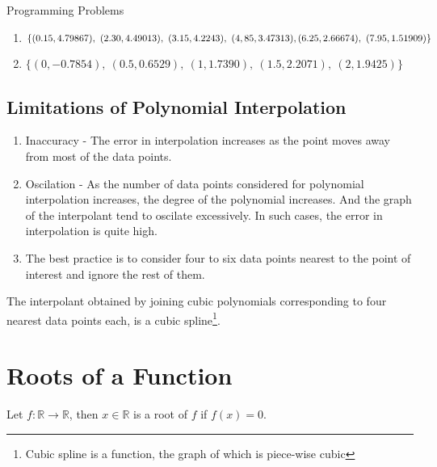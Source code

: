 \begin{remark}Programming Problems
	\begin{enumerate}
		\item $\{(0.15,4.79867),\ (2.30,4.49013),\ (3.15,4.2243),\ (4,85,3.47313),\\ (6.25,2.66674),\ (7.95,1.51909)\}$ \cite[Example 3.4]{kiusalaas}
		\item $\{(0,-0.7854),\ (0.5,0.6529),\ (1,1.7390),\ (1.5,2.2071),\ (2,1.9425)\}$\\ \cite[Problem Set 3.1.5]{kiusalaas}
	\end{enumerate}
\end{remark}

\subsection{Limitations of Polynomial Interpolation}
\begin{enumerate}
	\item Inaccuracy - The error in interpolation increases as the point moves away from most of the data points.
	\item Oscilation - As the number of data points considered for polynomial interpolation increases, the degree of the polynomial increases. And the graph of the interpolant tend to oscilate excessively. In such cases, the error in interpolation is quite high. 
	\item The best practice is to consider four to six data points nearest to the point of interest and ignore the rest of them.
\end{enumerate}

\begin{remark}
	The interpolant obtained by joining cubic polynomials corresponding to four nearest data points each, is a cubic spline\footnote{Cubic spline is a function, the graph of which is piece-wise cubic}.
\end{remark}

\section{Roots of a Function}
\begin{definition}
	Let $f : \mathbb{R} \to \mathbb{R}$, then $x \in \mathbb{R}$ is a root of $f$ if $f(x) = 0$.
\end{definition}

